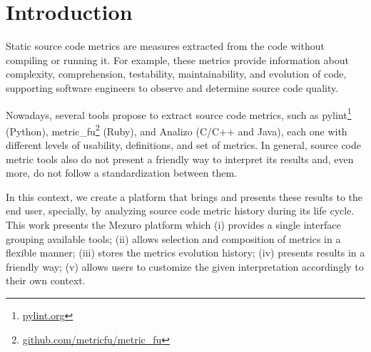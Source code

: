 \section{Introduction}
\label{sec:intro}

Static source code metrics are measures extracted from the code without
compiling or running it. For example, these metrics provide information about
complexity, comprehension, testability, maintainability, and evolution of code,
supporting software engineers to observe and determine source code
quality\cite{mills1988}.

Nowadays, several tools propose to extract source code metrics, such as
pylint\footnote{\url{pylint.org}} (Python),
metric\_fu\footnote{\url{github.com/metricfu/metric_fu}} (Ruby), and Analizo
(C/C++ and Java)\cite{terceiro2010analizo}, each one with different levels of
usability, definitions, and set of metrics.
%
In general, source code metric tools also do not present a friendly way to
interpret its results and, even more, do not follow a standardization between
them.

In this context, we create a platform that brings and presents these results to
the end user, specially, by analyzing source code metric history during its
life cycle.
%
This work presents the Mezuro platform which (i) provides a single interface
grouping available tools; (ii) allows selection and composition of metrics in a
flexible manner; (iii) stores the metrics evolution history; (iv) presents
results in a friendly way; (v) allows users to customize the given
interpretation accordingly to their own context.

